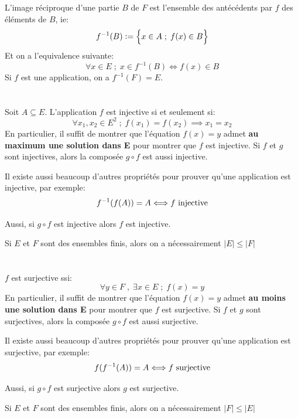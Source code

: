 \section*{}
L'image réciproque d'une partie \(B\) de \(F\) est l'ensemble des antécédents par \(f\) des éléments de \(B\), ie:
\[
   f^{-1}(B) := \Bigl\{ x \in A \; ; \; f(x) \in B \Bigl\}   
\]
Et on a l'equivalence suivante:
\[
   \forall x \in E \; ; \; x \in f^{-1}(B) \Longleftrightarrow f(x) \in B
\]
Si \(f\) est une application, on a \(f^{-1}(F) = E\). 
\section*{}
Soit \(A \subseteq E\).\+
L'application \(f\) est injective si et seulement si:
\[
   \forall x_1, x_2 \in E^2 \; ; \; f(x_1) = f(x_2) \implies x_1 = x_2 
\]
En particulier, il suffit de montrer que l'équation \(f(x) = y\) admet \textbf{au maximum une solution dans E} pour montrer que \(f\) est injective.\+
Si \(f\) et \(g\) sont injectives, alors la composée \(g \circ f\) est aussi injective. \<

Il existe aussi beaucoup d'autres propriétés pour prouver qu'une application est injective, par exemple:
\[
   f^{-1}(f(A)) = A \Longleftrightarrow f \text{ injective} \\
\]

Aussi, si \(g \circ f\) est injective alors \(f\) est injective.

Si \(E\) et \(F\) sont des ensembles finis, alors on a nécessairement \(|E| \leq |F|\)
\section*{}
\(f\) est surjective ssi:
\[
   \forall y \in F \; , \; \exists x \in E \; ; \; f(x) = y 
\]
En particulier, il suffit de montrer que l'équation \(f(x) = y\) admet \textbf{au moins une solution dans E} pour montrer que \(f\) est surjective.\+
Si \(f\) et \(g\) sont surjectives, alors la composée \(g \circ f\) est aussi surjective. \<

Il existe aussi beaucoup d'autres propriétés pour prouver qu'une application est surjective, par exemple:
\[
   f(f^{-1}(A)) = A \Longleftrightarrow f \text{ surjective} \\
\]

Aussi, si \(g \circ f\) est surjective alors \(g\) est surjective.

Si \(E\) et \(F\) sont des ensembles finis, alors on a nécessairement \(|F| \leq |E|\)
